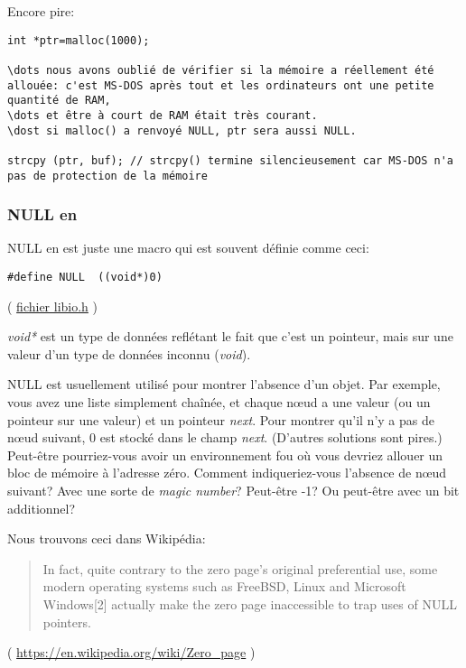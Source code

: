 Encore pire:

\begin{lstlisting}[style=customc]
int *ptr=malloc(1000);

\dots nous avons oublié de vérifier si la mémoire a réellement été allouée: c'est MS-DOS après tout et les ordinateurs ont une petite quantité de RAM,
\dots et être à court de RAM était très courant.
\dost si malloc() a renvoyé NULL, ptr sera aussi NULL.

strcpy (ptr, buf); // strcpy() termine silencieusement car MS-DOS n'a pas de protection de la mémoire
\end{lstlisting}

\subsubsection{NULL en \CCpp}

NULL en \CCpp est juste une macro qui est souvent définie comme ceci:

\begin{lstlisting}[style=customc]
#define NULL  ((void*)0)
\end{lstlisting}
( \href{https://github.com/wzhy90/linaro_toolchains/blob/8ff8ae680bac04558d10cc9626e12c4c2f6c1348/arm-cortex_a15-linux-gnueabihf/libc/usr/include/libio.h#L70}{fichier libio.h} )

\emph{void*} est un type de données reflétant le fait que c'est un pointeur, mais sur
une valeur d'un type de données inconnu (\emph{void}).

NULL est usuellement utilisé pour montrer l'absence d'un objet.
Par exemple, vous avez une liste simplement chaînée, et chaque n\oe{}ud a une valeur
(ou un pointeur sur une valeur) et un pointeur \emph{next}.
Pour montrer qu'il n'y a pas de n\oe{}ud suivant, 0 est stocké dans le champ \emph{next}.
(D'autres solutions sont pires.)
Peut-être pourriez-vous avoir un environnement fou où vous devriez allouer un bloc
de mémoire à l'adresse zéro. Comment indiqueriez-vous l'absence de n\oe{}ud suivant?
Avec une sorte de \emph{magic number}? Peut-être -1? Ou peut-être avec un bit additionnel?

Nous trouvons ceci dans Wikipédia:

\begin{framed}
\begin{quotation}
In fact, quite contrary to the zero page's original preferential use, some modern operating systems such as FreeBSD, Linux and Microsoft Windows[2] actually make the zero page inaccessible to trap uses of NULL pointers. 
\end{quotation}
\end{framed}
( \url{https://en.wikipedia.org/wiki/Zero_page} )

